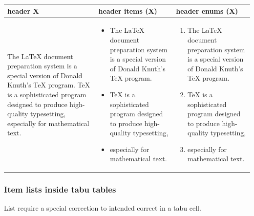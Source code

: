 \begin{filecontents*}{\democodefile}
\begin{center}
\small\centering\renewcommand{\arraystretch}{1.4}  
\begin{tabu} to 1.0\textwidth {X[1,l]X[1,l]X[1,l]}
\hline
   \centering header X &
   \centering header items (X) &   
   \centering header enums (X) \tabularnewline
\hline
%
The \LaTeX{} document preparation system is a special version of Donald
Knuth's \TeX{} program. \TeX{} is a sophisticated program designed to 
produce high-quality typesetting, especially for mathematical text.
&
\tableitemize
\begin{itemize}
\item The \LaTeX{} document preparation system is a special version of Donald
Knuth's \TeX{} program.
\item \TeX{} is a sophisticated program designed to produce high-quality typesetting,
\item especially for mathematical text.
\end{itemize}
&
\tableitemize
\begin{enumerate}
\item The \LaTeX{} document preparation system is a special version of Donald
Knuth's \TeX{} program.
\item \TeX{} is a sophisticated program designed to produce high-quality typesetting,
\item especially for mathematical text.
\end{enumerate}
\tabularnewline
\hline
\end{tabu}
\end{center}
\end{filecontents*}

\subsubsection{Item lists inside tabu tables}
\label{sec:tableitemliststabu}
List require a special correction to intended correct in a tabu cell.

%

